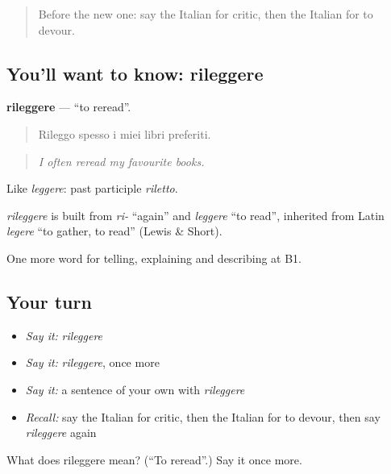 \label{lesson:IT-C526-rileggere}



\begin{quote}
Before the new one: say the Italian for critic, then the Italian for to devour.
\end{quote}

\subsection*{You'll want to know: rileggere}
\textbf{rileggere} — \textquotedblleft{}to reread\textquotedblright{}.

\begin{quote}
Rileggo spesso i miei libri preferiti.
\end{quote}

\begin{quote}
\emph{I often reread my favourite books.}
\end{quote}

Like \emph{leggere}: past participle \emph{riletto}.

\begin{cousinweb}
\emph{rileggere} is built from \emph{ri-} \textquotedblleft{}again\textquotedblright{} and \emph{leggere} \textquotedblleft{}to read\textquotedblright{}, inherited from Latin \emph{legere} \textquotedblleft{}to gather, to read\textquotedblright{} (Lewis \& Short).
\end{cousinweb}

\begin{grammarlens}[title={What you've built}]
One more word for telling, explaining and describing at B1.
\end{grammarlens}

\subsection*{Your turn}
\begin{itemize}
\raggedright
  \item \emph{Say it:} \emph{rileggere}
  \item \emph{Say it:} \emph{rileggere}, once more
  \item \emph{Say it:} a sentence of your own with \emph{rileggere}
  \item \emph{Recall:} say the Italian for critic, then the Italian for to devour, then say \emph{rileggere} again
\end{itemize}

\begin{tcolorbox}[breakable,colback=teal!4,colframe=teal!35!black,title={Before you move on}]
What does rileggere mean? (\textquotedblleft{}To reread\textquotedblright{}.) Say it once more.
\end{tcolorbox}
